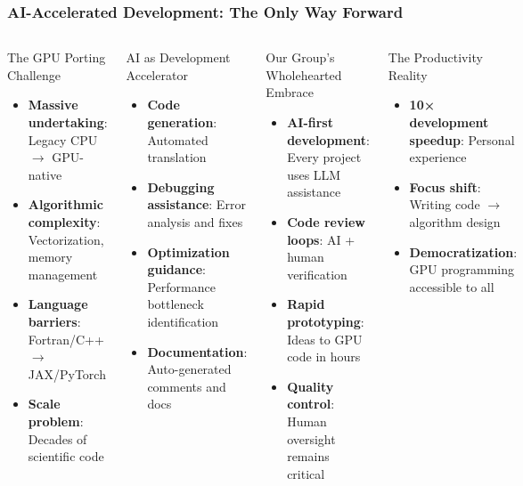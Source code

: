 \documentclass[aspectratio=169]{beamer}
\begin{document}
\begin{frame}
    \frametitle{AI-Accelerated Development: The Only Way Forward}
    \begin{columns}
        \begin{block}{The GPU Porting Challenge}
            \begin{itemize}
                \item \textbf{Massive undertaking}: Legacy CPU $\rightarrow$ GPU-native
                \item \textbf{Algorithmic complexity}: Vectorization, memory management
                \item \textbf{Language barriers}: Fortran/C++ $\rightarrow$ JAX/PyTorch
                \item \textbf{Scale problem}: Decades of scientific code
            \end{itemize}
        \end{block}
        \begin{block}{AI as Development Accelerator}
            \begin{itemize}
                \item \textbf{Code generation}: Automated translation
                \item \textbf{Debugging assistance}: Error analysis and fixes
                \item \textbf{Optimization guidance}: Performance bottleneck identification
                \item \textbf{Documentation}: Auto-generated comments and docs
            \end{itemize}
        \end{block}
        \begin{block}{Our Group's Wholehearted Embrace}
            \begin{itemize}
                \item \textbf{AI-first development}: Every project uses LLM assistance
                \item \textbf{Code review loops}: AI + human verification
                \item \textbf{Rapid prototyping}: Ideas to GPU code in hours
                \item \textbf{Quality control}: Human oversight remains critical
            \end{itemize}
        \end{block}
        \begin{block}{The Productivity Reality}
            \begin{itemize}
                \item \textbf{10× development speedup}: Personal experience
                \item \textbf{Focus shift}: Writing code $\rightarrow$ algorithm design
                \item \textbf{Democratization}: GPU programming accessible to all
            \end{itemize}
        \end{block}
    \end{columns}
\end{frame}
\end{document}
